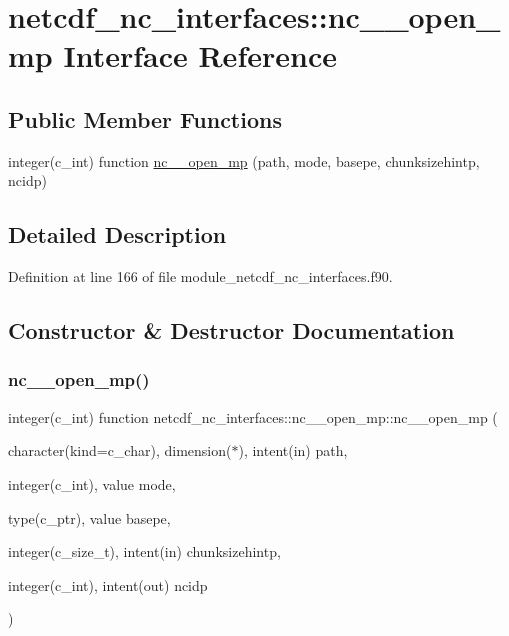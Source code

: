 \hypertarget{interfacenetcdf__nc__interfaces_1_1nc____open__mp}{}\section{netcdf\+\_\+nc\+\_\+interfaces\+:\+:nc\+\_\+\+\_\+open\+\_\+mp Interface Reference}
\label{interfacenetcdf__nc__interfaces_1_1nc____open__mp}
\subsection*{Public Member Functions}
\begin{DoxyCompactItemize}
\item 
integer(c\+\_\+int) function \hyperlink{interfacenetcdf__nc__interfaces_1_1nc____open__mp_afca0b89dad808bc0be22593c54ef5627}{nc\+\_\+\+\_\+open\+\_\+mp} (path, mode, basepe, chunksizehintp, ncidp)
\end{DoxyCompactItemize}


\subsection{Detailed Description}


Definition at line 166 of file module\+\_\+netcdf\+\_\+nc\+\_\+interfaces.\+f90.



\subsection{Constructor \& Destructor Documentation}
\mbox{\label{interfacenetcdf__nc__interfaces_1_1nc____open__mp_afca0b89dad808bc0be22593c54ef5627}} 
\subsubsection{\texorpdfstring{nc\+\_\+\+\_\+open\+\_\+mp()}{nc\_\_open\_mp()}}
{\footnotesize\ttfamily integer(c\+\_\+int) function netcdf\+\_\+nc\+\_\+interfaces\+::nc\+\_\+\+\_\+open\+\_\+mp\+::nc\+\_\+\+\_\+open\+\_\+mp (\begin{DoxyParamCaption}\item[{character(kind=c\+\_\+char), dimension($\ast$), intent(in)}]{path,  }\item[{integer(c\+\_\+int), value}]{mode,  }\item[{type(c\+\_\+ptr), value}]{basepe,  }\item[{integer(c\+\_\+size\+\_\+t), intent(in)}]{chunksizehintp,  }\item[{integer(c\+\_\+int), intent(out)}]{ncidp }\end{DoxyParamCaption})}




